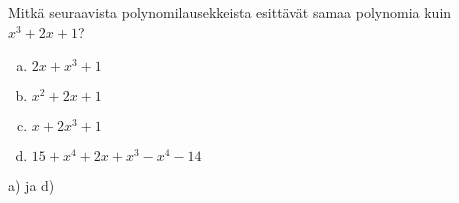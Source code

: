%

\begin{tehtava}
	Mitkä seuraavista polynomilausekkeista esittävät samaa polynomia kuin
	$x^3+2x+1$?
	\begin{enumerate}[a)]
		\item $2x+x^3+1$
		\item $x^2+2x+1$
		\item $x+2x^3+1$
		\item $15+x^4+2x+x^3-x^4-14$
	\end{enumerate}
	\begin{vastaus}
		a) ja d)
	\end{vastaus}
\end{tehtava}
